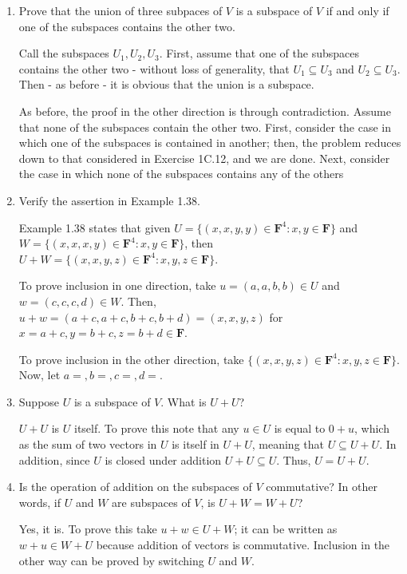 \documentclass{book}
\begin{document}
\begin{enumerate}
\item Prove that the union of three subpaces of \(V\) is a subspace of \(V\) if and only if one of the subspaces contains the other two.

Call the subspaces \(U_1, U_2, U_3\).  First, assume that one of the subspaces contains the other two - without loss of generality, that \(U_1 \subseteq U_3\) and \(U_2 \subseteq U_3\).  Then - as before - it is obvious that the union is a subspace.

As before, the proof in the other direction is through contradiction.  Assume that none of the subspaces contain the other two.  First, consider the case in which one of the subspaces is contained in another; then, the problem reduces down to that considered in Exercise 1C.12, and we are done.  Next, consider the case in which none of the subspaces contains any of the others

\item Verify the assertion in Example 1.38.

Example 1.38 states that given \(U=\{(x,x,y,y) \in \textbf{F}^4:x,y \in \textbf{F}\}\) and \(W=\{(x,x,x,y) \in \textbf{F}^4:x,y \in \textbf{F}\}\), then \(U+W=\{(x,x,y,z) \in \textbf{F}^4:x,y,z \in \textbf{F}\}\).

To prove inclusion in one direction, take \(u=(a,a,b,b) \in U\) and \(w=(c,c,c,d) \in W\).  Then, \(u+w=(a+c,a+c,b+c,b+d)=(x,x,y,z)\) for \(x=a+c,y=b+c,z=b+d \in \textbf{F}\).

To prove inclusion in the other direction, take \(\{(x,x,y,z) \in \textbf{F}^4:x,y,z \in \textbf{F}\}\).  Now, let \(a=,b=,c=,d=\).  

\item Suppose \(U\) is a subspace of \(V\).  What is \(U+U\)?

\(U+U\) is \(U\) itself.  To prove this note that any \(u \in U\) is equal to \(0+u\), which as the sum of two vectors in \(U\) is itself in \(U+U\), meaning that \(U \subseteq U+U\).  In addition, since \(U\) is closed under addition \(U+U \subseteq U\).  Thus, \(U = U+U\).

\item Is the operation of addition on the subspaces of \(V\) commutative? In other words, if \(U\) and \(W\) are subspaces of \(V\), is \(U+W=W+U\)?

Yes, it is.  To prove this take \(u+w \in U+W\); it can be written as \(w+u \in W+U\) because addition of vectors is commutative.  Inclusion in the other way can be proved by switching \(U\) and \(W\).


\end{enumerate}
\end{document}
